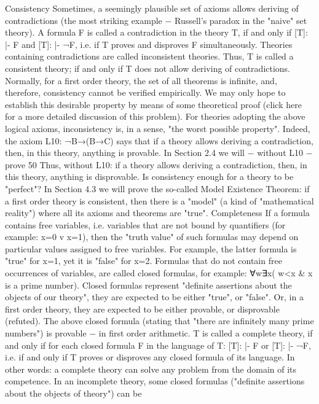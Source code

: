 Consistency
Sometimes, a seemingly plausible set of axioms allows deriving of contradictions (the most striking
example − Russell's paradox in the "naive" set theory). A formula F is called a contradiction in the
theory T, if and only if [T]: |- F and [T]: |- ¬F, i.e. if T proves and disproves F simultaneously. Theories
containing contradictions are called inconsistent theories. Thus, T is called a consistent theory; if and
only if T does not allow deriving of contradictions.
Normally, for a first order theory, the set of all theorems is infinite, and, therefore, consistency cannot be
verified empirically. We may only hope to establish this desirable property by means of some
theoretical proof (click here for a more detailed discussion of this problem).
For theories adopting the above logical axioms, inconsistency is, in a sense, "the worst possible property".
Indeed, the axiom L10: ¬B→(B→C) says that if a theory allows deriving a contradiction, then, in this
theory, anything is provable. In Section 2.4 we will − without L10 − prove 50%
Thus, without L10: if a theory allows deriving a contradiction, then, in this theory, anything is
disprovable.
Is consistency enough for a theory to be "perfect"? In Section 4.3 we will prove the so-called Model
Existence Theorem: if a first order theory is consistent, then there is a "model" (a kind of "mathematical
reality") where all its axioms and theorems are "true".
Completeness
If a formula contains free variables, i.e. variables that are not bound by quantifiers (for example: x=0 v
x=1), then the "truth value" of such formulas may depend on particular values assigned to free variables.
For example, the latter formula is "true" for x=1, yet it is "false" for x=2. Formulas that do not contain
free occurrences of variables, are called closed formulas, for example:
∀w∃x( w<x & x is a prime number).
Closed formulas represent "definite assertions about the objects of our theory", they are expected to be
either "true", or "false". Or, in a first order theory, they are expected to be either provable, or disprovable
(refuted). The above closed formula (stating that "there are infinitely many prime numbers") is provable −
in first order arithmetic.
T is called a complete theory, if and only if for each closed formula F in the language of T: [T]: |- F or
[T]: |- ¬F, i.e. if and only if T proves or disproves any closed formula of its language. In other words: a
complete theory can solve any problem from the domain of its competence.
In an incomplete theory, some closed formulas ("definite assertions about the objects of theory") can be
